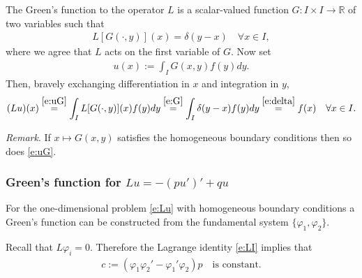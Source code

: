 \documentclass[12pt,a4paper]{article}
\newcommand{\from}{\colon}
\newcommand{\IR}{\mathbb{R}}
\begin{document}
    
    The Green's function to the operator $L$ 
    is a scalar-valued function 
    $G \from I \times I \to \IR$
    of two variables
    such that
    \begin{align}
        \label{e:G}
        L [ G(\cdot, y) ](x)
        =
        \delta(y - x)
        \quad
        \forall x \in I
        ,
    \end{align}
    where we agree that $L$ acts on the first variable of $G$.
    Now set
    \begin{align}
        \label{e:uG}
        u(x) := \int_I G(x, y) f(y) dy
        .
    \end{align}
    Then, bravely exchanging differentiation in $x$ and integration in $y$,
    \begin{align}
        (L u)(x)
        \stackrel{\eqref{e:uG}}{=}
        \int_I L[ G(\cdot, y) ](x) f(y) dy
        \stackrel{\eqref{e:G}}{=}
        \int_I \delta(y - x) f(y) dy
        \stackrel{\eqref{e:delta}}{=}
        f(x)
        \quad
        \forall x \in I
        .
    \end{align}

    
    \emph{Remark}.
    If $x \mapsto G(x, y)$ satisfies
    the homogeneous boundary conditions
    then so does \eqref{e:uG}.
    
    
    \subsubsection*{Green's function for $L u = -(p u')' + q u$}
    
    For the one-dimensional problem \eqref{e:Lu}
    with homogeneous boundary conditions
    a Green's function can be constructed
    from the fundamental system $\{ \varphi_1, \varphi_2 \}$.
    
    
    Recall that $L \varphi_i = 0$.
    Therefore
    the Lagrange identity \eqref{e:LI}
    implies that 
    \begin{align}
        \label{e:c}
        c := (\varphi_1 \varphi_2' - \varphi_1' \varphi_2) p
        \quad
        \text{is constant}.
    \end{align}
    
\end{document}

